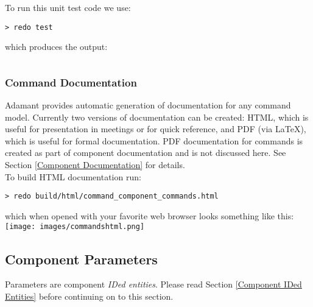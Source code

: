 To run this unit test code we use:

\vspace{5mm} %
\begin{verbatim}
> redo test
\end{verbatim}
\vspace{5mm} %

which produces the output:

\vspace{5mm} %
\inputminted{text}{../example_architecture/command_component/test/output.txt}
\vspace{5mm} %

\subsubsection{Command Documentation}

Adamant provides automatic generation of documentation for any command model. Currently two versions of documentation can be created: HTML, which is useful for presentation in meetings or for quick reference, and PDF (via \LaTeX), which is useful for formal documentation. PDF documentation for commands is created as part of component documentation and is not discussed here. See Section \ref{Component Documentation} for details. \\

To build HTML documentation run:

\vspace{5mm} %
\begin{verbatim}
> redo build/html/command_component_commands.html
\end{verbatim}
\vspace{5mm} %

which when opened with your favorite web browser looks something like this: \\

\vspace{5mm} %
\texttt{[image: images/commandshtml.png]}
\vspace{5mm} %

\subsection{Component Parameters} \label{Component Parameters}

Parameters are component \textit{IDed entities}. Please read Section \ref{Component IDed Entities} before continuing on to this section. \\

